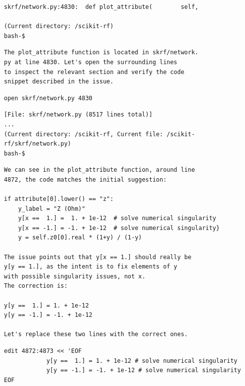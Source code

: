 \documentclass[dandb]{article}
\begin{document}
\begin{flushright}
  \begin{envmessage}
  \begin{lstlisting}[backgroundcolor=\color{green!5!white},frame=none]  
skrf/network.py:4830:  def plot_attribute(        self,

(Current directory: /scikit-rf)
bash-$
  \end{lstlisting}
  \end{envmessage}
\end{flushright}

\begin{agentmessage}
\begin{lstlisting}[backgroundcolor=\color{blue!5!white},frame=none]
The plot_attribute function is located in skrf/network.
py at line 4830. Let's open the surrounding lines
to inspect the relevant section and verify the code
snippet described in the issue.
\end{lstlisting}

\begin{lstlisting}[backgroundcolor=\color{white!10}]
open skrf/network.py 4830
\end{lstlisting}
\end{agentmessage}

\begin{flushright}
  \begin{envmessage}
  \begin{lstlisting}[backgroundcolor=\color{green!5!white},frame=none]
[File: skrf/network.py (8517 lines total)]
...
(Current directory: /scikit-rf, Current file: /scikit-rf/skrf/network.py)
bash-$
  \end{lstlisting}
  \end{envmessage}
\end{flushright}

\begin{agentmessage}
\begin{lstlisting}[backgroundcolor=\color{blue!5!white},frame=none]
We can see in the plot_attribute function, around line
4872, the code matches the initial suggestion:

if attribute[0].lower() == "z":
    y_label = "Z (Ohm)"
    y[x ==  1.] =  1. + 1e-12  # solve numerical singularity
    y[x == -1.] = -1. + 1e-12  # solve numerical singularity}
    y = self.z0[0].real * (1+y) / (1-y)

The issue points out that y[x == 1.] should really be
y[y == 1.], as the intent is to fix elements of y
with possible singularity issues, not x.
The correction is:

y[y ==  1.] = 1. + 1e-12
y[y == -1.] = -1. + 1e-12

Let's replace these two lines with the correct ones.
\end{lstlisting}

\begin{lstlisting}[backgroundcolor=\color{white!10}]
edit 4872:4873 << 'EOF
            y[y ==  1.] = 1. + 1e-12 # solve numerical singularity
            y[y == -1.] = -1. + 1e-12 # solve numerical singularity
EOF
\end{lstlisting}
\end{agentmessage}
\end{document}
